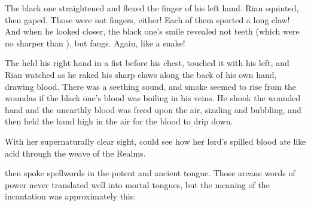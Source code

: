 \begin{garbage}
The black one straightened and flexed the finger of his left hand. 
Rian squinted, then gaped. 
Those were not \scathaese{} fingers, either! Each of them sported a long claw! 
And when he looked closer, the black one's smile revealed not \scathaese{} teeth (which were no sharper than \psp{\humans}), but fangs.
Again, like a snake! 


The \scatha{} held his right hand in a fist before his chest, touched it with his left, and Rian watched as he raked his sharp claws along the back of his own hand, drawing blood. There was a seething sound, and smoke seemed to rise from the wound\prikker as if the black one's blood was boiling in his veins. He shook the wounded hand and the unearthly blood was freed upon the air, sizzling and bubbling, and then held the hand high in the air for the blood to drip down. 







\begin{comment}
\subsubsection{\Criseis}
\end{comment}
\new
\index{\xzaishann}%
\index{\shaeeroth}%
With her supernaturally clear sight, \Criseis{} could see how her lord's spilled blood ate like acid through the weave of the Realms. 

\QuessanthIshnaruchaefir{} then spoke spellwords in the potent and ancient  tongue. Those arcane words of power never translated well into mortal tongues, but the meaning of the incantation was approximately this: 

\index{\Rystessakhin}
\index{\AeocrithRystessakhin}
\index{\ophidian}


\end{garbage}
